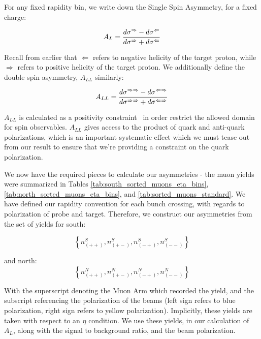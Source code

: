 For any fixed rapidity bin, we write down the Single Spin Asymmetry, for a fixed
charge:

\begin{equation}
  A_L = {
    {d\sigma^{\Rightarrow} - d\sigma^{\Leftarrow}}
    \over
    {d\sigma^{\Rightarrow} + d\sigma^{\Leftarrow}}
  }
\end{equation}

Recall from earlier that $\Leftarrow$ refers to negative helicity of the target
proton, while $\Rightarrow$ refers to positive helicity of the target proton. We
additionally define the double spin asymmetry, $A_{LL}$ similarly:

\begin{equation}
  A_{LL} = {
    {d\sigma^{\Rightarrow\Rightarrow}-d\sigma^{\Leftarrow\Rightarrow}}
    \over
    {d\sigma^{\Rightarrow\Rightarrow}+d\sigma^{\Leftarrow\Rightarrow}}
  }
\end{equation}

$A_{LL}$ is calculated as a positivity constraint~\cite{Kang2011} in order
restrict the allowed domain for spin observables. $A_{LL}$ gives access to the
product of quark and anti-quark polarizations, which is an important systematic
effect which we must tease out from our result to ensure that we're providing a
constraint on the quark polarization.

We now have the required pieces to calculate our asymmetries - the muon yields
were summarized in Tables \ref{tab:south_sorted_muons_eta_bins},
\ref{tab:north_sorted_muons_eta_bins}, and \ref{tab:sorted_muons_standard}. We
have defined our rapidity convention for each bunch crossing, with regards to
polarization of probe and target. Therefore, we construct our asymmetries from
the set of yields for south:

\begin{equation}
  \left\{
  n_{\left(++\right)}^S,
  n_{\left(+-\right)}^S,
  n_{\left(-+\right)}^S,
  n_{\left(--\right)}^S
  \right\}
  \label{eq:muon_yield_north}
\end{equation}

and north:
\begin{equation}
  \left\{
  n_{\left(++\right)}^N,
  n_{\left(+-\right)}^N,
  n_{\left(-+\right)}^N,
  n_{\left(--\right)}^N
  \right\}
  \label{eq:muon_yield_south}
\end{equation}

With the superscript denoting the Muon Arm which recorded the yield, and the
subscript referencing the polarization of the beams (left sign refers to blue
polarization, right sign refers to yellow polarization). Implicitly, these
yields are taken with respect to an $\eta$ condition. We use these yields, in
our calculation of $A_L$, along with the signal to background ratio, and the
beam polarization.

